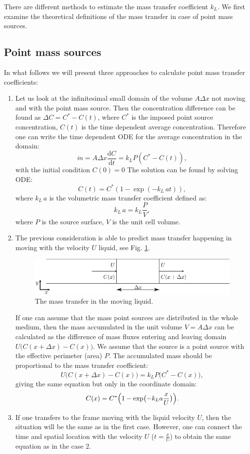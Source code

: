 \documentclass{article}
\newcommand{\beq}{\begin{equation}}
\newcommand{\feq}{\end{equation}}
\newcommand{\vol}{k_L\,a}
\newcommand{\cstar}{C^{*}}
\begin{document}
There are different methods to estimate the mass transfer coefficient $k_L$. We first examine the
theoretical definitions of the mass transfer in case of point mass sources.
\subsection{Point mass sources}
In what follows we will present three approaches to calculate point mass transfer
coefficients:
\begin{enumerate}
\item
Let us look at the infinitesimal small domain of the volume $A \Delta x$ not
moving and with the point mass source. Then the concentration difference can be found as $\Delta C =
\cstar -
C(t)$, where $\cstar$ is the imposed point source concentration, $C(t)$ is
the time dependent average concentration. Therefore one can write the time dependent ODE for the
average concentration in the domain:
\beq
\dot{m}= A \Delta x \frac{\mathrm{d}C}{\mathrm{d} t} = k_L P (\cstar-C(t)), 
\feq
with the initial condition $C(0)=0$
The solution can be found by solving ODE:
\beq
C(t)= \cstar (1-\exp(-\vol t )), 
\feq
where $\vol$ is the volumetric mass transfer coefficient defined as:
\beq
\vol=k_L \frac{P}{V},
\feq
where $P$ is the source surface, $V$ is the unit cell volume.
\item
The previous consideration is able to predict mass transfer happening in moving with the velocity
$U$ liquid, see Fig. \ref{fig:moving:frame}. 
\begin{figure}[htb!]
\includegraphics[width=\textwidth]{Figures/mass_transfer.eps}
\caption{The mass transfer in the moving liquid. \label{fig:moving:frame}}
\end{figure}

If one can assume that the mass point sources are distributed in the whole medium, then the mass accumulated in the unit volume $V=A \Delta x$ can be calculated as the difference of 
mass fluxes entering and leaving domain $U \bigl(C(x+\Delta x)-C(x)\bigr)$. We assume that the
source is a point source with the effective perimeter (area) $P$. The accumulated mass should be proportional
to the mass transfer coefficient:
\beq
U \bigl(C(x+\Delta x)-C(x)\bigr)=k_L P \bigl(\cstar-C(x)\bigr), 
\feq 
giving the same equation but only in the coordinate domain:
\beq
C(x)= \cstar \Bigl(1-\exp\bigl(-k_L a \frac{x}{U} \bigr)\Bigr).
\label{main:mass:transfer:expression} 
\feq

\item If one transfers to the frame moving with the liquid velocity $U$, then the situation will be
the same as in the first case. However, one can connect the time and spatial location with the
velocity $U$ ($t=\frac{x}{U}$) to obtain the same equation as in the case 2.
\end{enumerate}
\end{document}
